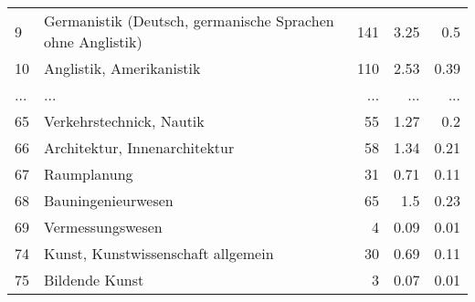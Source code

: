 \begin{longtable}{lXrrr}
        9 & \multicolumn{1}{X}{Germanistik (Deutsch, germanische Sprachen ohne Anglistik)} & %
          \num{141} &
          \num[round-mode=places,round-precision=2]{3.25} &
          \num[round-mode=places,round-precision=2]{0.5} \\
        10 & \multicolumn{1}{X}{Anglistik, Amerikanistik} & %
          \num{110} &
          \num[round-mode=places,round-precision=2]{2.53} &
          \num[round-mode=places,round-precision=2]{0.39} \\
       ... & ... & ... & ... & ... \\
        65 & \multicolumn{1}{X}{Verkehrstechnick, Nautik} & %
          \num{55} &
          \num[round-mode=places,round-precision=2]{1.27} &
          \num[round-mode=places,round-precision=2]{0.2} \\

        66 & \multicolumn{1}{X}{Architektur, Innenarchitektur} & %
          \num{58} &
          \num[round-mode=places,round-precision=2]{1.34} &
          \num[round-mode=places,round-precision=2]{0.21} \\

        67 & \multicolumn{1}{X}{Raumplanung} & %
          \num{31} &
          \num[round-mode=places,round-precision=2]{0.71} &
          \num[round-mode=places,round-precision=2]{0.11} \\

        68 & \multicolumn{1}{X}{Bauningenieurwesen} & %
          \num{65} &
          \num[round-mode=places,round-precision=2]{1.5} &
          \num[round-mode=places,round-precision=2]{0.23} \\

        69 & \multicolumn{1}{X}{Vermessungswesen} & %
          \num{4} &
          \num[round-mode=places,round-precision=2]{0.09} &
          \num[round-mode=places,round-precision=2]{0.01} \\

        74 & \multicolumn{1}{X}{Kunst, Kunstwissenschaft allgemein} & %
          \num{30} &
          \num[round-mode=places,round-precision=2]{0.69} &
          \num[round-mode=places,round-precision=2]{0.11} \\

        75 & \multicolumn{1}{X}{Bildende Kunst} & %
          \num{3} &
          \num[round-mode=places,round-precision=2]{0.07} &
          \num[round-mode=places,round-precision=2]{0.01} \\


\end{longtable}
